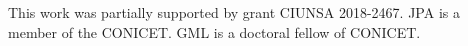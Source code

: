 \documentclass[useAMS,referee,usenatbib]{biom}
\begin{document}
This work was partially supported by grant CIUNSA 2018-2467. JPA is a member of the CONICET. GML is a doctoral fellow of CONICET.
\vspace*{-8pt}

%





%
  
 

%
%
%
\end{document}
